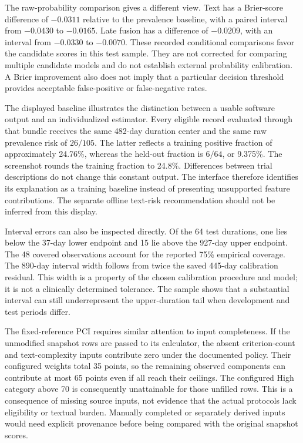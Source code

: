 \documentclass[10pt,letterpaper,twocolumn]{article}
\begin{document}
The raw-probability comparison gives a different view. Text has a Brier-score difference of $-0.0311$ relative to the prevalence baseline, with a paired interval from $-0.0430$ to $-0.0165$. Late fusion has a difference of $-0.0209$, with an interval from $-0.0330$ to $-0.0070$. These recorded conditional comparisons favor the candidate scores in this test sample. They are not corrected for comparing multiple candidate models and do not establish external probability calibration. A Brier improvement also does not imply that a particular decision threshold provides acceptable false-positive or false-negative rates.

The displayed baseline illustrates the distinction between a usable software output and an individualized estimator. Every eligible record evaluated through that bundle receives the same 482-day duration center and the same raw prevalence risk of $26/105$. The latter reflects a training positive fraction of approximately 24.76\%, whereas the held-out fraction is $6/64$, or 9.375\%. The screenshot rounds the training fraction to 24.8\%. Differences between trial descriptions do not change this constant output. The interface therefore identifies its explanation as a training baseline instead of presenting unsupported feature contributions. The separate offline text-risk recommendation should not be inferred from this display.

Interval errors can also be inspected directly. Of the 64 test durations, one lies below the 37-day lower endpoint and 15 lie above the 927-day upper endpoint. The 48 covered observations account for the reported 75\% empirical coverage. The 890-day interval width follows from twice the saved 445-day calibration residual. This width is a property of the chosen calibration procedure and model; it is not a clinically determined tolerance. The sample shows that a substantial interval can still underrepresent the upper-duration tail when development and test periods differ.

The fixed-reference PCI requires similar attention to input completeness. If the unmodified snapshot rows are passed to its calculator, the absent criterion-count and text-complexity inputs contribute zero under the documented policy. Their configured weights total 35 points, so the remaining observed components can contribute at most 65 points even if all reach their ceilings. The configured High category above 70 is consequently unattainable for those unfilled rows. This is a consequence of missing source inputs, not evidence that the actual protocols lack eligibility or textual burden. Manually completed or separately derived inputs would need explicit provenance before being compared with the original snapshot scores.
\end{document}

